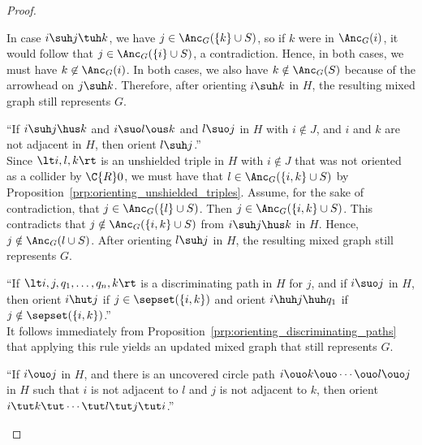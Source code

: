 \begin{proof}
\begin{description}
      In case $i \suh j \tuh k$, we have $j \in \Anc_G(\{k\} \cup S)$, so if $k$ were in $\Anc_G(i)$, it would follow that $j \in \Anc_G(\{i\}\cup S)$, a contradiction.
      Hence, in both cases, we must have $k \not\in \Anc_G(i)$.
      In both cases, we also have $k \notin \Anc_G(S)$ because of the arrowhead on $j \suh k$.
      Therefore, after orienting $i \suh k$ in $H$, the resulting mixed graph still represents $G$.
    \item[$\C{R}3$] ``If $i \suh j \hus k$ and $i \suo l \ous k$ and $l \suo j$ in $H$ with $i \notin J$, and $i$ and $k$ are not adjacent in $H$, then orient $l \suh j$.''\\
      Since $\lt i, l, k \rt$ is an unshielded triple in $H$ with $i \notin J$ that was not oriented as a collider by $\C{R}0$, we must have that $l \in \Anc_G(\{i,k\} \cup S)$ by Proposition~\ref{prp:orienting_unshielded_triples}.
      Assume, for the sake of contradiction, that $j \in \Anc_G(\{l\} \cup S)$. 
      Then $j \in \Anc_G(\{i,k\} \cup S)$.
      This contradicts that $j \notin \Anc_G(\{i,k\} \cup S)$ from $i \suh j \hus k$ in $H$.
      Hence, $j \notin \Anc_G(l \cup S)$.
      After orienting $l \suh j$ in $H$, the resulting mixed graph still represents $G$.
    \item[$\C{R}4$] ``If $\lt i, j, q_1, \dots, q_n, k \rt$ is a discriminating path in $H$ for $j$, and if $i \suo j$ in $H$, then orient $i \hut j$ if $j \in \sepset(\{i,k\})$ and orient $i \huh j \huh q_1$ if $j \notin \sepset(\{i,k\})$.''\\ %
      It follows immediately from Proposition~\ref{prp:orienting_discriminating_paths} that applying this rule yields an updated mixed graph that still represents $G$.
    \item[$\C{R}5$] ``If $i \ouo j$ in $H$, and there is an uncovered circle path $i \ouo k \ouo \cdots \ouo l \ouo j$ in $H$ such that $i$ is not adjacent to $l$ and $j$ is not adjacent to $k$, then orient $i \tut k \tut \cdots \tut l \tut j \tut i$.''\\

\end{description}
\end{proof}
